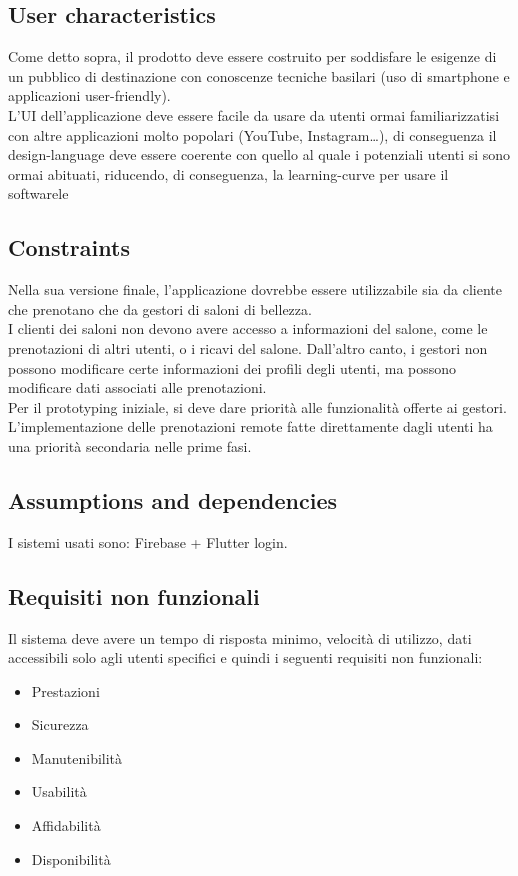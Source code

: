 \documentclass{article}
\begin{document}
\subsection {User characteristics} 
Come detto sopra, il prodotto deve essere costruito per soddisfare le esigenze di un pubblico di destinazione con conoscenze tecniche basilari (uso di smartphone e applicazioni user-friendly). 
\\L’UI dell’applicazione deve essere facile da usare da utenti ormai familiarizzatisi con altre applicazioni molto popolari (YouTube, Instagram…), di conseguenza il design-language deve essere coerente con quello al quale i potenziali utenti si sono ormai abituati, riducendo, di conseguenza, la learning-curve per usare il softwarele
\subsection {Constraints} 
Nella sua versione finale, l’applicazione dovrebbe essere utilizzabile sia da cliente che prenotano che da gestori di saloni di bellezza. 
\\I clienti dei saloni non devono avere accesso a informazioni del salone, come le prenotazioni di altri utenti, o i ricavi del salone. Dall’altro canto, i gestori non possono modificare certe informazioni dei profili degli utenti, ma possono modificare dati associati alle prenotazioni. 
\\Per il prototyping iniziale, si deve dare priorità alle funzionalità offerte ai gestori. L’implementazione delle prenotazioni remote fatte direttamente dagli utenti ha una priorità secondaria nelle prime fasi.
\subsection {Assumptions and dependencies} I sistemi usati sono: Firebase + Flutter login.
\subsection {Requisiti non funzionali} 
Il sistema deve avere un tempo di risposta minimo, velocità di utilizzo, dati accessibili solo
agli utenti specifici e quindi i seguenti requisiti non funzionali:
\begin{itemize}
    \item Prestazioni
    \item Sicurezza
    \item Manutenibilità
    \item Usabilità
    \item Affidabilità
    \item Disponibilità
\end{itemize}
\end{document}
